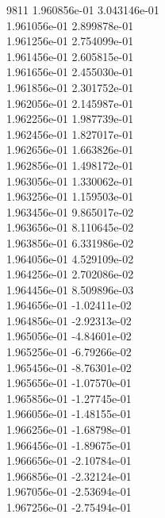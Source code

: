 9811	1.960856e-01	3.043146e-01	\\ 	1.961056e-01	2.899878e-01	\\ 	1.961256e-01	2.754099e-01	\\ 	1.961456e-01	2.605815e-01	\\ 	1.961656e-01	2.455030e-01	\\ 	1.961856e-01	2.301752e-01	\\ 	1.962056e-01	2.145987e-01	\\ 	1.962256e-01	1.987739e-01	\\ 	1.962456e-01	1.827017e-01	\\ 	1.962656e-01	1.663826e-01	\\ 	1.962856e-01	1.498172e-01	\\ 	1.963056e-01	1.330062e-01	\\ 	1.963256e-01	1.159503e-01	\\ 	1.963456e-01	9.865017e-02	\\ 	1.963656e-01	8.110645e-02	\\ 	1.963856e-01	6.331986e-02	\\ 	1.964056e-01	4.529109e-02	\\ 	1.964256e-01	2.702086e-02	\\ 	1.964456e-01	8.509896e-03	\\ 	1.964656e-01	-1.02411e-02	\\ 	1.964856e-01	-2.92313e-02	\\ 	1.965056e-01	-4.84601e-02	\\ 	1.965256e-01	-6.79266e-02	\\ 	1.965456e-01	-8.76301e-02	\\ 	1.965656e-01	-1.07570e-01	\\ 	1.965856e-01	-1.27745e-01	\\ 	1.966056e-01	-1.48155e-01	\\ 	1.966256e-01	-1.68798e-01	\\ 	1.966456e-01	-1.89675e-01	\\ 	1.966656e-01	-2.10784e-01	\\ 	1.966856e-01	-2.32124e-01	\\ 	1.967056e-01	-2.53694e-01	\\ 	1.967256e-01	-2.75494e-01	\\ \hline
